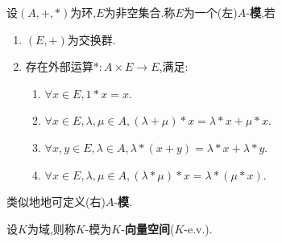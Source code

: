 \begin{deff}
    设$(A, +, *)$为环,$E$为非空集合.称$E$为一个(左)$A$-\textbf{模},若
    \begin{enumerate}
        \item $(E, +)$为交换群.
        \item 存在外部运算$*: A \times E \to E$,满足:
        \begin{enumerate}
            \item $\forall x \in E, 1 * x = x$.
            \item $\forall x \in E, \lambda, \mu \in A, (\lambda + \mu) * x = \lambda * x + \mu * x$.
            \item $\forall x, y \in E, \lambda \in A, \lambda * (x + y) = \lambda * x + \lambda * y$.
            \item $\forall x \in E, \lambda, \mu \in A, (\lambda * \mu) * x = \lambda * (\mu * x)$.
        \end{enumerate}
    \end{enumerate}
\end{deff}

\begin{rqq}
    类似地地可定义(右)$A$-\textbf{模}.
\end{rqq}

\begin{deff}
    设$K$为域,则称$K$-模为$K$-\textbf{向量空间}($K$-e.v.).
\end{deff}